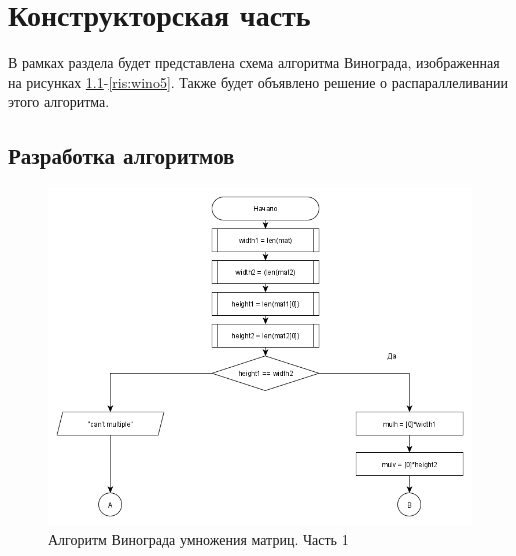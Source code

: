 \documentclass[a4paper,12pt]{report}
\begin{document}
    \newpage

   \chapter{Конструкторская часть}
        \label{sec:construct_part}

        	В рамках раздела будет представлена схема алгоритма Винограда, изображенная на рисунках \ref{ris:wino1}-\ref{ris:wino5}. Также будет объявлено решение о распараллеливании этого алгоритма. 

	\section{Разработка алгоритмов}
	
		\begin{figure}[h!]
			\centering
			\includegraphics[width=1\linewidth]{part11.png}
			\caption{Алгоритм Винограда умножения матриц. Часть 1}
			\label{ris:wino1}
		\end{figure}
		
		\newpage
		
\end{document}
